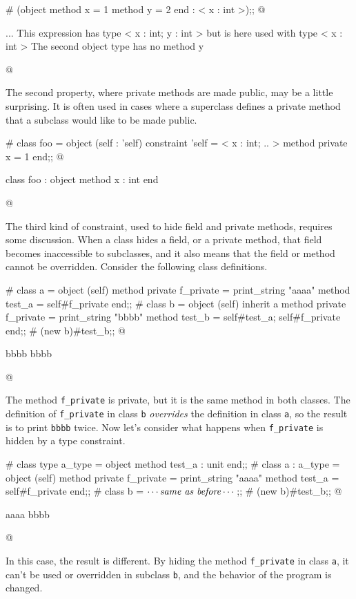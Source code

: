 \begin{ocaml}
# (object method x = 1 method y = 2 end : < x : int >);;
@
\begin{topoutput}
...
This expression has type < x : int; y : int > but is here used with type
  < x : int >
The second object type has no method y
\end{topoutput}
@
\end{ocaml}
%
The second property, where private methods are made public, may be a little surprising.  It is often
used in cases where a superclass defines a private method that a subclass would like to be made
public.

\begin{ocaml}
# class foo =
  object (self : 'self)
     constraint 'self = < x : int; .. >
     method private x = 1
  end;;
@
\begin{topoutput}
class foo : object method x : int end
\end{topoutput}
@
\end{ocaml}
%
The third kind of constraint, used to hide field and private methods, requires some discussion.
When a class hides a field, or a private method, that field becomes inaccessible to subclasses, and
it also means that the field or method cannot be overridden.  Consider the following class
definitions.

\begin{ocaml}
# class a =
object (self)
   method private f_private = print_string "aaaa\n"
   method test_a = self#f_private
end;;
# class b =
object (self)
   inherit a
   method private f_private = print_string "bbbb\n"
   method test_b =
      self#test_a;
      self#f_private
end;;
# (new b)#test_b;;
@
\begin{topoutput}
bbbb
bbbb
\end{topoutput}
@
\end{ocaml}
%
The method \hbox{\lstinline/f_private/} is private, but it is the same method in both classes.  The definition
of \hbox{\lstinline/f_private/} in class \hbox{\lstinline/b/} \emph{overrides} the definition in class \hbox{\lstinline/a/},
so the result is to print \hbox{\lstinline/bbbb/} twice.
Now let's consider what happens when \hbox{\lstinline/f_private/} is hidden by a type constraint.

\begin{ocaml}
# class type a_type = object method test_a : unit end;;
# class a : a_type =
  object (self)
     method private f_private = print_string "aaaa\n"
     method test_a = self#f_private
  end;;
# class b = $\cdots\hbox{\textit{same as before}}\cdots$;;
# (new b)#test_b;;
@
\begin{topoutput}
aaaa
bbbb
\end{topoutput}
@
\end{ocaml}
%
In this case, the result is different.  By hiding the method \hbox{\lstinline/f_private/} in
class \hbox{\lstinline/a/}, it can't be used or overridden in subclass \hbox{\lstinline/b/}, and the behavior of
the program is changed.


